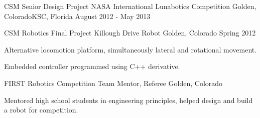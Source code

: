 

\begin{cventries}

  \cventry
    {CSM Senior Design Project} %
    {NASA International Lunabotics Competition} %
    {Golden, Colorado{\enskip\cdotp\enskip}KSC, Florida} %
    {August 2012 - May 2013} %
    {
      \begin{cvitems} %
        \item {}
      \end{cvitems}
    }

  \cventry
    {CSM Robotics Final Project} %
    {Killough Drive Robot} %
    {Golden, Colorado} %
    {Spring 2012} %
    {
      \begin{cvitems} %
        \item {Alternative locomotion platform, simultaneously lateral and rotational movement.}
        \item {Embedded controller programmed using C++ derivative.}
      \end{cvitems}
    }

  \cventry
    {FIRST Robotics Competition} %
    {Team Mentor, Referee} %
    {Golden, Colorado} %
    {} %
    {
      \begin{cvitems} %
        \item {Mentored high school students in engineering principles, helped design and build a robot for competition.}
      \end{cvitems}
    }

\end{cventries}
